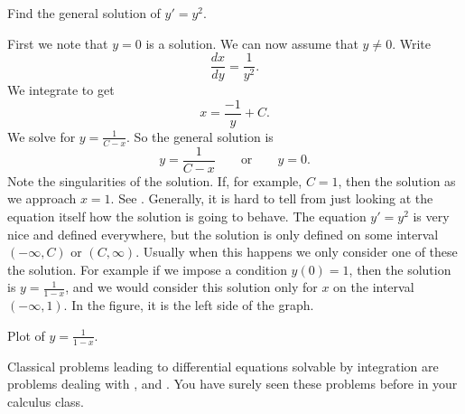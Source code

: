 \begin{example}
Find the general solution of
$y' = y^2$.

First we note that $y=0$ is a solution.  We can now assume that $y \not= 0$.
Write
\begin{equation*}
\frac{dx}{dy} = \frac{1}{y^2} .
\end{equation*}
We integrate to get
\begin{equation*}
x = \frac{-1}{y} + C .
\end{equation*}
We solve for $y = \frac{1}{C-x}$.
So the general solution is
\begin{equation*}
y = \frac{1}{C-x} \qquad \text{or} \qquad y = 0.
\end{equation*}
Note the singularities of the solution.  If, for example, $C=1$, then the
solution  as we approach $x=1$.  See
.  Generally,
it is hard to tell
from just looking at the equation itself how the solution is going to behave.
The equation $y' = y^2$ is very nice and defined everywhere, but
the solution is only defined on some interval $(-\infty, C)$ or
$(C, \infty)$.  Usually when this happens we only consider one of these
the solution.  For example if we impose a condition $y(0) = 1$, then
the solution is $y=\frac{1}{1-x}$, and we would consider this solution only
for $x$ on the interval $(-\infty,1)$.  In the figure, it is the left side
of the graph.
\begin{myfig}
\capstart
{}
\caption{Plot of $y=\frac{1}{1-x}$.\label{1over1mx:fig}}
\end{myfig}
\end{example}

Classical problems leading to differential equations solvable by integration
are problems 
dealing with ,
 and .  You have surely seen these
problems before in your calculus class.

